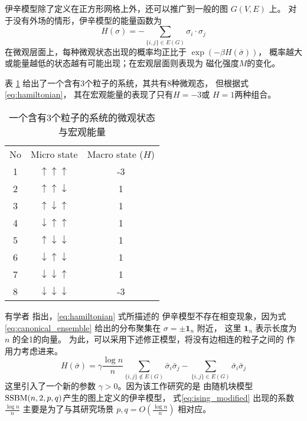 伊辛模型除了定义在正方形网格上外，还可以推广到一般的图 $G(V, E)$ 上。
对于没有外场的情形，伊辛模型的能量函数为
\begin{equation}\label{eq:hamiltonian}
	H(\sigma) = -\sum_{\{i,j\} \in E(G)} \sigma_i \cdot \sigma_j
\end{equation}
在微观层面上，每种微观状态出现的概率均正比于 $\exp(-\beta H(\bar{\sigma}))$，
概率越大或能量越低的状态越有可能出现；在宏观层面则表现为
磁化强度$M$的变化。

\begin{example}
  表 \ref{tab:particles_3} 给出了一个含有3个粒子的系统，其共有8种微观态，
  但根据式\eqref{eq:hamiltonian}， 其在宏观能量的表现了只有$H=-3$或 $H=1$两种组合。
\begin{table}
  \centering
\begin{tabular}{ccc}
		No & Micro state & Macro state ($H$) \\
		1 & $\uparrow\uparrow\uparrow$ & -3 \\
		2 & $\uparrow\uparrow\downarrow$ & 1 \\
		3 & $\uparrow\downarrow\uparrow$ & 1 \\
		4 & $\downarrow\uparrow\uparrow$ & 1 \\
		5 & $\uparrow\downarrow\downarrow$ & 1    \\
6 & $\downarrow\uparrow\downarrow$ & 1 \\
7 & $\downarrow\downarrow\uparrow$ & 1 \\
8 & $\downarrow\downarrow\downarrow$ & -3 \\
\end{tabular}
\caption{一个含有3个粒子的系统的微观状态与宏观能量}
\label{tab:particles_3}
\end{table}
\end{example}

有学者\cite{ye2020exact}
指出，\eqref{eq:hamiltonian} 式所描述的
伊辛模型不存在相变现象，因为式\eqref{eq:canonical_ensemble}
给出的分布聚集在 $\sigma=\pm \mathbf{1}_n$ 附近，
这里 $\mathbf{1}_n$ 表示长度为 $n$ 的全1的向量。
为此，可以采用下述修正模型，将没有边相连的粒子之间的
作用力考虑进来。
\begin{equation}\label{eq:ising_modified}
  H(\bar{\sigma}) = \gamma \frac{\log n}{n} \sum_{\{i,j\}\not\in E(G)}
  \bar{\sigma}_i  \bar{\sigma}_j
	- \sum_{\{i,j\}\in E(G)}
  \bar{\sigma}_i  \bar{\sigma}_j
\end{equation}
这里引入了一个新的参数 $\gamma > 0$。因为该工作研究的是
由随机块模型 $\operatorname{SSBM}(n,2,p,q)$产生的图上定义的伊辛模型，
式\eqref{eq:ising_modified} 出现的系数
$\frac{\log n}{n}$
主要是为了与其研究场景 $p,q=O(\frac{\log n}{n})$
相对应。

